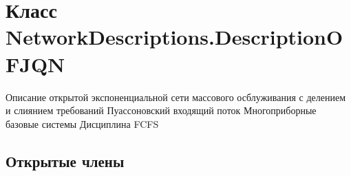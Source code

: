 \hypertarget{class_network_descriptions_1_1_description_o_f_j_q_n}{}\section{Класс Network\+Descriptions.\+Description\+O\+F\+J\+QN}
\label{class_network_descriptions_1_1_description_o_f_j_q_n}


Описание открытой экспоненциальной сети массового осблуживания с делением и слиянием требований Пуассоновский входящий поток Многоприборные базовые системы Дисциплина F\+C\+FS  


\subsection*{Открытые члены}
